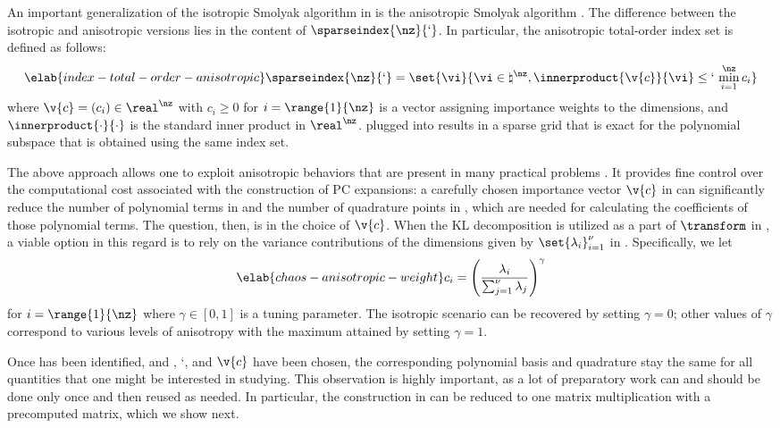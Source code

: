An important generalization of the isotropic Smolyak algorithm in
 is the anisotropic Smolyak algorithm \cite{nobile2008}.
The difference between the isotropic and anisotropic versions lies in the
content of $\sparseindex{\nz}{\lq}$. In particular, the anisotropic total-order
index set is defined as follows:
\begin{equation} \elab{index-total-order-anisotropic}
  \sparseindex{\nz}{\lq} = \set{\vi}{\vi \in \natural^\nz, \innerproduct{\v{c}}{\vi} \leq \lq \, \min_{i = 1}^\nz c_i}
\end{equation}
where $\v{c} = (c_i) \in \real^\nz$ with $c_i \geq 0$ for $i = \range{1}{\nz}$
is a vector assigning importance weights to the dimensions, and
$\innerproduct{\cdot}{\cdot}$ is the standard inner product in $\real^\nz$.
 plugged into 
results in a sparse grid that is exact for the polynomial subspace that is
obtained using the same index set.

The above approach allows one to exploit anisotropic behaviors that are present
in many practical problems \cite{nobile2008}. It provides fine control over the
computational cost associated with the construction of \ac{PC} expansions: a
carefully chosen importance vector $\v{c}$ in
 can significantly reduce the number of
polynomial terms in  and the number of quadrature points
in , which are needed for calculating the coefficients
of those polynomial terms. The question, then, is in the choice of $\v{c}$. When
the \ac{KL} decomposition is utilized as a part of $\transform$ in
, a viable option in this regard is to rely on the
variance contributions of the dimensions given by $\set{\lambda_i}_{i = 1}^\nu$
in . Specifically, we let
\begin{equation} \elab{chaos-anisotropic-weight}
  c_i = \left(\frac{\lambda_i}{\sum_{j = 1}^\nu \lambda_j}\right)^\gamma
\end{equation}
for $i = \range{1}{\nz}$ where $\gamma \in [0, 1]$ is a tuning parameter. The
isotropic scenario can be recovered by setting $\gamma = 0$; other values of
$\gamma$ correspond to various levels of anisotropy with the maximum attained by
setting $\gamma = 1$.

Once \vz has been identified, and \lc, \lq, and $\v{c}$ have been chosen, the
corresponding polynomial basis and quadrature stay the same for all quantities
that one might be interested in studying. This observation is highly important,
as a lot of preparatory work can and should be done only once and then reused as
needed. In particular, the construction in  can be reduced
to one matrix multiplication with a precomputed matrix, which we show next.


